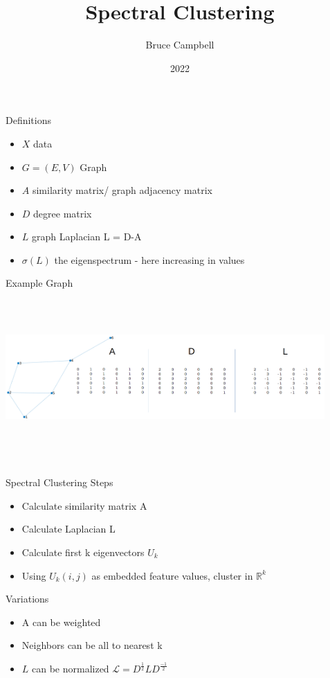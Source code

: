 \documentclass{beamer}
\title{Spectral Clustering}
\author{Bruce Campbell}
\institute{OSU Math 5603 Final Project}
\date{2022}
\begin{document}
\frame{\titlepage}

\begin{frame}{Definitions}
\begin{itemize}
    \item $X$ data
    \item $G=(E,V)$ Graph 
    \item $A$ similarity matrix/ graph adjacency matrix
    \item $D$ degree matrix
    \item $L$ graph Laplacian L = D-A
    \item $\sigma(L)$ the eigenspectrum - here increasing in values 
\end{itemize} 
\end{frame}


\begin{frame}{Example Graph}
\includegraphics[width=4.8in,height=2.6in]{images/G_A_L.png}
\end{frame}


\begin{frame}{Spectral Clustering Steps}
\begin{itemize}
    \item Calculate similarity matrix A
    \item Calculate Laplacian L
    \item Calculate first k eigenvectors $U_k$
    \item Using $U_k(i,j)$ as embedded feature values, cluster in $\mathbb{R}^k$
\end{itemize}
\end{frame}

\begin{frame}{Variations }
\begin{itemize}
    \item A can be weighted 
    \item Neighbors can be all to nearest k
    \item $L$ can be normalized  $\mathcal{L} = D^{\frac{1}{2}} L D^{\frac{-1}{2}}$
\end{itemize}
\end{frame}
\end{document}
